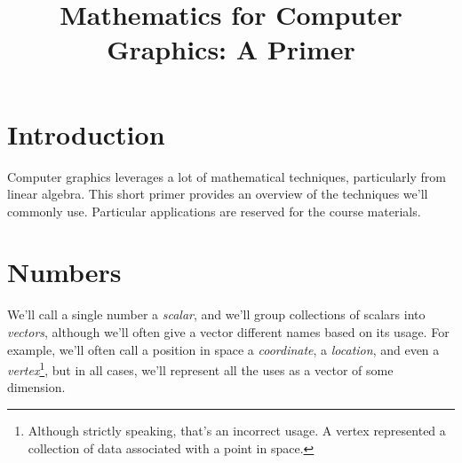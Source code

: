 \documentclass{article}
\title{Mathematics for Computer Graphics: A Primer}
\date{}
\begin{document}
\maketitle

\section*{Introduction}
Computer graphics leverages a lot of mathematical techniques, particularly from linear algebra.  This short primer provides an overview of the techniques we'll commonly use.  Particular applications are reserved for the course materials.

\section*{Numbers}
We'll call a single number a \emph{scalar}, and we'll group collections of scalars into \emph{vectors}, although we'll often give a vector different names based on its usage.  For example, we'll often call a position in space a \emph{coordinate}, a \emph{location}, and even a \emph{vertex}\footnote{Although strictly speaking, that's an incorrect usage.  A vertex represented a collection of data associated with a point in space.}, but in all cases, we'll represent all the uses as a vector of some dimension. 
\end{document}
